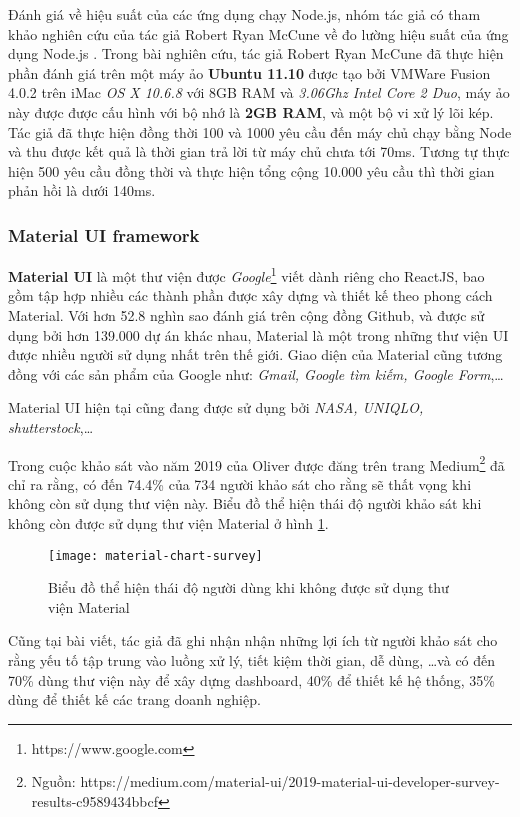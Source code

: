 \documentclass[../main-report.tex]{subfiles}
\begin{document}
Đánh giá về hiệu suất của các ứng dụng chạy Node.js, nhóm tác giả có tham khảo nghiên cứu của tác giả Robert Ryan McCune về đo lường hiệu suất của ứng dụng Node.js \cite{mccune2011node}. Trong bài nghiên cứu, tác giả Robert Ryan McCune đã thực hiện phần đánh giá trên một máy ảo \textbf{Ubuntu 11.10} được tạo bởi VMWare Fusion 4.0.2 trên iMac \textit{OS X 10.6.8} với 8GB RAM và \textit{3.06Ghz Intel Core 2 Duo}, máy ảo này được được cấu hình với bộ nhớ là \textbf{2GB RAM}, và một bộ vi xử lý lõi kép. Tác giả đã thực hiện đồng thời 100 và 1000 yêu cầu đến máy chủ chạy bằng Node và thu được kết quả là thời gian trả lời từ máy chủ chưa tới 70ms. Tương tự thực hiện 500 yêu cầu đồng thời và thực hiện tổng cộng 10.000 yêu cầu thì thời gian phản hồi là dưới 140ms.

\subsubsection{Material UI framework}
\textbf{Material UI} là một thư viện được \textit{Google}\footnote{https://www.google.com} viết dành riêng cho ReactJS, bao gồm tập hợp nhiều các thành phần được xây dựng và thiết kế theo phong cách Material. Với hơn 52.8 nghìn sao đánh giá trên cộng đồng Github, và được sử dụng bởi hơn 139.000 dự án khác nhau, Material là một trong những thư viện UI được nhiều người sử dụng nhất trên thế giới. Giao diện của Material cũng tương đồng với các sản phẩm của Google như: \textit{Gmail, Google tìm kiếm, Google Form},\ldots

Material UI hiện tại cũng đang được sử dụng bởi \textit{NASA, UNIQLO, shutterstock},\ldots

Trong cuộc khảo sát vào năm 2019 của Oliver được đăng trên trang Medium\footnote{Nguồn: https://medium.com/material-ui/2019-material-ui-developer-survey-results-c9589434bbcf} đã chỉ ra rằng, có đến 74.4\% của 734 người khảo sát cho rằng sẽ thất vọng khi không còn sử dụng thư viện này. Biểu đồ thể hiện thái độ người khảo sát khi không còn được sử dụng thư viện Material ở hình \ref{fig:material-chart-survey}.

\begin{figure}[ht!]
\begin{center}
\label{fig:material-chart-survey}
\texttt{[image: material-chart-survey]}
\caption{Biểu đồ thể hiện thái độ người dùng khi không được sử dụng thư viện Material}
\end{center}
\end{figure}

Cũng tại bài viết, tác giả đã ghi nhận nhận những lợi ích từ người khảo sát cho rằng yếu tố tập trung vào luồng xử lý, tiết kiệm thời gian, dễ dùng, \ldots và có đến 70\% dùng thư viện này để xây dựng dashboard, 40\% để thiết kế hệ thống, 35\% dùng để thiết kế các trang doanh nghiệp.
\end{document}
